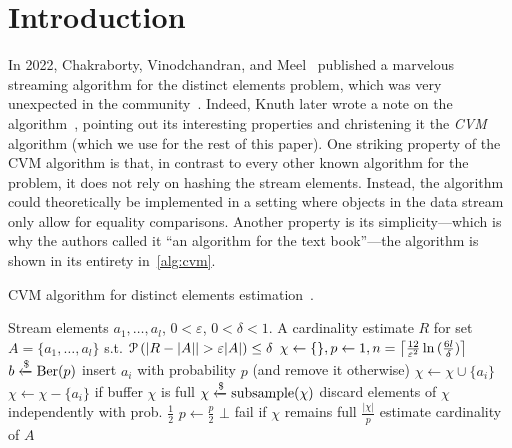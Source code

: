 \section{Introduction}
\label{sec:intro}

In 2022, Chakraborty, Vinodchandran, and Meel~\cite{chakraborty2022} published a marvelous streaming algorithm for the distinct elements problem, which was very unexpected in the community~\cite{quanta}.
Indeed, Knuth later wrote a note on the algorithm~\cite{knuthnote}, pointing out its interesting properties and christening it the \emph{CVM} algorithm (which we use for the rest of this paper).
One striking property of the CVM algorithm is that, in contrast to every other known algorithm for the problem, it does not rely on hashing the stream elements.
Instead, the algorithm could theoretically be implemented in a setting where objects in the data stream only allow for equality comparisons.
Another property is its simplicity---which is why the authors called it ``an algorithm for the text book''---the algorithm is shown in its entirety in~\cref{alg:cvm}.

\begin{algorithm}[h!]
	\caption{CVM algorithm for distinct elements estimation~\cite{chakraborty2022}.}\label{alg:cvm}
	\begin{algorithmic}[1]
  \Require Stream elements $a_1,\dots,a_l$, $0 < \varepsilon$, $0 < \delta < 1$.
  \Ensure A cardinality estimate $R$ for set $A = \{ a_1,\dots,a_l \}$ s.t. $\prob \left( |R - |A| | > \varepsilon |A| \right) \leq \delta$
  \State $\chi \gets \{\}, p \gets 1, n = \ceil*{\frac{12}{\varepsilon^2} \ln{(\frac{6l}{\delta})} }$
    \State $b \getsr \Ber(p)$ \Comment insert $a_i$ with probability $p$ (and remove it otherwise)
      \State $\chi \gets \chi \cup \{a_i\}$
    \Else
      \State $\chi \gets \chi - \{a_i\}$
    \EndIf
     \Comment if buffer $\chi$ is full
      \State $\chi \getsr \mathrm{subsample}(\chi)$ \Comment discard elements of $\chi$ independently with prob. $\frac{1}{2}$
      \State $p \gets \frac{p}{2}$
    \EndIf
      \Return $\bot$ \Comment fail if $\chi$ remains full
    \EndIf
  \EndFor
  \State \Return $\frac{|\chi|}{p}$ \Comment estimate cardinality of $A$
  \end{algorithmic}
\end{algorithm}

